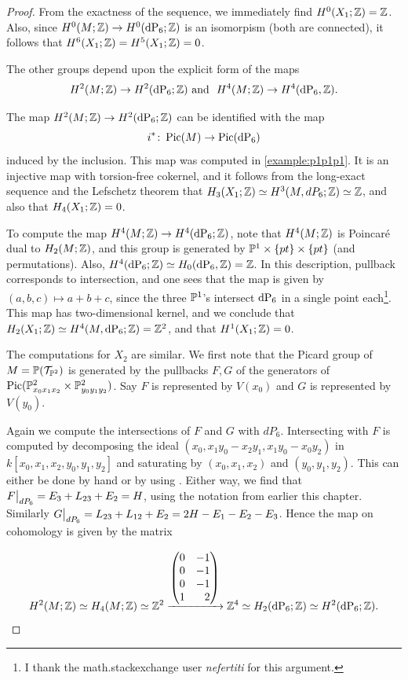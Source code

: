 \begin{proof}
From the exactness of the sequence, we immediately find $H^0(X_1;\Z)=\Z$. Also, since $H^0(M;\Z) \to H^0(\dP6;\Z)$ is an isomorpism (both are connected), it follows that $H^6(X_1;\Z)=H^5(X_1;\Z)=0$.

The other groups depend upon the explicit form of the maps \[{H^2(M;\Z) \to H^2(\dP6;\Z)} \text{ and } {H^4(M;\Z) \to H^4(\dP6,\Z)}.\]

The map $H^2(M;\Z) \to H^2(\dP6;\Z)$ can be identified with the map \[{i^\ast \colon \Pic(M) \to \Pic(\dP6)}\] induced by the inclusion. This map was computed in \cref{example:p1p1p1}. It is an injective map with torsion-free cokernel, and it follows from the long-exact sequence and the Lefschetz theorem that $H_3(X_1;\Z) \simeq H^3(M,dP_6; \Z) \simeq \Z$, and also that $H_4(X_1;\Z)=0$.

To compute the map $H^4(M;\Z) \to H^4(\dP6;\Z)$, note that $H^4(M;\Z)$ is Poincaré dual to $H_ 2(M;\Z)$, and this group is generated by $\P^1 \times \{pt\} \times \{ pt\}$ (and permutations). Also, $H^4(\dP6;\Z) \simeq H_0(\dP6,\Z)=\Z$. In this description, pullback corresponds to intersection, and one sees that the map is given by $(a,b,c) \mapsto a+b+c$, since the three $\P^1$'s intersect $\dP6$ in a single point each\footnote{I thank the math.stackexchange user \emph{nefertiti} for this argument.}. This map has two-dimensional kernel, and we conclude that $H_2(X_1;\Z) \simeq H^4(M,\dP6;\Z) = \Z^2$, and that $H^1(X_1;\Z)=0$.

The computations for $X_2$ are similar. We first note that the Picard group of $M=\P(\mathcal T_{\P^2})$ is generated by the pullbacks $F,G$ of the generators of ${\Pic(\P^2_{x_0x_1x_2} \times \P^2_{y_0y_1y_2})}$. Say $F$ is represented by $V(x_0)$ and $G$ is represented by $V(y_0)$.

Again we compute the intersections of $F$ and $G$ with $dP_6$. Intersecting with $F$ is computed by decomposing the ideal $(x_0,x_1y_0-x_2y_1,x_1y_0-x_0y_2)$ in $k[x_0,x_1,x_2,y_0,y_1,y_2]$ and saturating by $(x_0,x_1,x_2)$ and $(y_0,y_1,y_2)$. This can either be done by hand or by using \MM. Either way, we find that $\restr{F}{dP_6} = E_3+L_{23} + E_2=H$, using the notation from earlier this chapter. Similarly $\restr{G}{dP_6}=L_{23}+L_{12}+E_2=2H-E_1-E_2-E_3$. Hence the map on cohomology is given by the matrix

\[
H^2(M;\Z) \simeq H_4(M;\Z) \simeq \Z^2 \xrightarrow{
	\begin{pmatrix*}[r]
	0 & -1 \\
	0 & -1 \\
	0 & -1  \\
	1 & 2 
	\end{pmatrix*}
} \Z^4 \simeq H_2(\dP6;\Z) \simeq H^2(\dP6;\Z).
\]


\end{proof}
